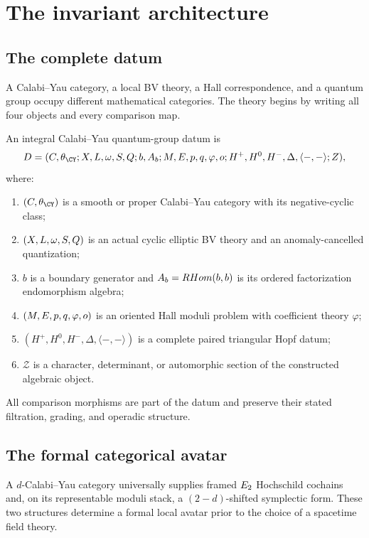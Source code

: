 
\part{The invariant architecture}
\chapter{The complete datum}
A Calabi--Yau category, a local BV theory, a Hall correspondence, and a quantum group occupy different mathematical categories.  The theory begins by writing all four objects and every comparison map.

\begin{definition}
An integral Calabi--Yau quantum-group datum is
\[
 \mathfrak D=(\Ccal,\theta_{\CY};X,\Lcal,\omega,S,Q;
 b,A_b;\M,\mathcal E,p,q,\varphi,o;
 H^+,H^0,H^-,\Delta,\langle-,-\rangle;\mathcal Z),
\]
where:
\begin{enumerate}
\item $(\Ccal,\theta_{\CY})$ is a smooth or proper Calabi--Yau category with its negative-cyclic class;
\item $(X,L,\omega,S,Q)$ is an actual cyclic elliptic BV theory and an anomaly-cancelled quantization;
\item $b$ is a boundary generator and $A_b=RHom(b,b)$ is its ordered factorization endomorphism algebra;
\item $(M,E,p,q,\varphi,o)$ is an oriented Hall moduli problem with coefficient theory $\varphi$;
\item $(H^+,H^0,H^-,\Delta,\langle-,-\rangle)$ is a complete paired triangular Hopf datum;
\item $\mathcal Z$ is a character, determinant, or automorphic section of the constructed algebraic object.
\end{enumerate}
All comparison morphisms are part of the datum and preserve their stated filtration, grading, and operadic structure.
\end{definition}

\chapter{The formal categorical avatar}
A $d$-Calabi--Yau category universally supplies framed $E_2$ Hochschild cochains and, on its representable moduli stack, a $(2-d)$-shifted symplectic form.  These two structures determine a formal local avatar prior to the choice of a spacetime field theory.

